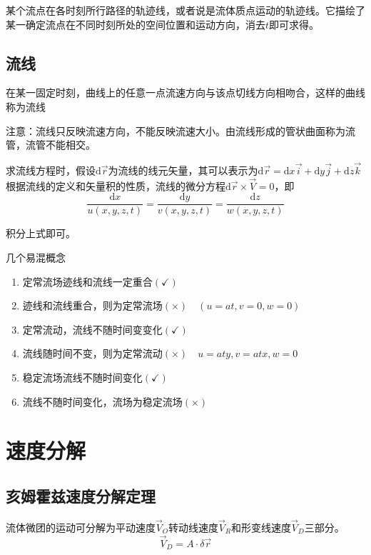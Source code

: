 \documentclass[a4paper,oneside]{ctexbook}
\begin{document}
某个流点在各时刻所行路径的轨迹线，或者说是流体质点运动的轨迹线。它描绘了某一确定流点在不同时刻所处的空间位置和运动方向，消去\(t\)即可求得。

\subsection{流线}

在某一固定时刻，曲线上的任意一点流速方向与该点切线方向相吻合，这样的曲线称为流线

注意：流线只反映流速方向，不能反映流速大小。由流线形成的管状曲面称为流管，流管不能相交。

求流线方程时，假设\(\mathrm{d}\overrightarrow{r}\)为流线的线元矢量，其可以表示为\(\mathrm{d}\overrightarrow{r}=\mathrm{d}x\overrightarrow{i}+\mathrm{d}y\overrightarrow{j}+\mathrm{d}z\overrightarrow{k}\)根据流线的定义和矢量积的性质，流线的微分方程\(\mathrm{d}\overrightarrow{r}\times\overrightarrow{V}=0\)，即
\begin{equation}
    \dfrac{\mathrm{d}x}{u(x,y,z,t)}=\dfrac{\mathrm{d}y}{v(x,y,z,t)}=\dfrac{\mathrm{d}z}{w(x,y,z,t)}
\end{equation}

积分上式即可。

几个易混概念
\begin{enumerate}
    \item 定常流场迹线和流线一定重合\((\checkmark)\)
    \item 迹线和流线重合，则为定常流场\((\times)\quad(u=at,v=0,w=0)\)
    \item 定常流动，流线不随时间变变化\((\checkmark)\)
    \item 流线随时间不变，则为定常流动\((\times)\quad{}u=aty,v=atx,w=0\)
    \item 稳定流场流线不随时间变化\((\checkmark)\)
    \item 流线不随时间变化，流场为稳定流场\((\times)\)
\end{enumerate}

\section{速度分解}

\subsection{亥姆霍兹速度分解定理}

流体微团的运动可分解为平动速度\(\overrightarrow{V}_O\)转动线速度\(\overrightarrow{V}_R\)和形变线速度\(\overrightarrow{V}_D\)三部分。\begin{equation}\overrightarrow{V}_D=A\cdot\delta\overrightarrow{r}\end{equation}
\end{document}
